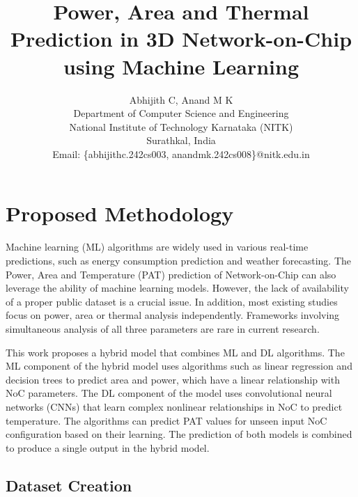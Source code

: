 \documentclass[conference]{IEEEtran}
\begin{document}
\title{Power, Area and Thermal Prediction in 3D Network-on-Chip using Machine Learning}

\author{Abhijith C, Anand M K \\
Department of Computer Science and Engineering \\ 
National Institute of Technology Karnataka (NITK) \\ 
Surathkal, India\\
Email: \{abhijithc.242cs003, anandmk.242cs008\}@nitk.edu.in}

\maketitle

\section{Proposed Methodology}

Machine learning (ML) algorithms are widely used in various real-time predictions, such as energy consumption prediction and weather forecasting. The Power, Area and Temperature (PAT) prediction of Network-on-Chip can also leverage the ability of machine learning models. However, the lack of availability of a proper public dataset is a crucial issue. In addition, most existing studies focus on power, area or thermal analysis independently. Frameworks involving simultaneous analysis of all three parameters are rare in current research.

This work proposes a hybrid model that combines ML and DL algorithms. The ML component of the hybrid model uses algorithms such as linear regression and decision trees to predict area and power, which have a linear relationship with NoC parameters. The DL component of the model uses convolutional neural networks (CNNs) that learn complex nonlinear relationships in NoC to predict temperature. The algorithms can predict PAT values for unseen input NoC configuration based on their learning. The prediction of both models is combined to produce a single output in the hybrid model.

\subsection{Dataset Creation}
\end{document}
